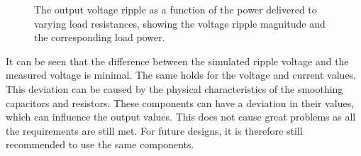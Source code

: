 \begin{figure}[H]
\begin{minipage}{0.48\textwidth}
        \label{tab:CharacteristicsSim}
    \end{minipage}\hfill
    \begin{minipage}{0.48\textwidth}
        \centering
        \captionsetup{justification=raggedright, labelfont=bf}
        \caption{The output voltage ripple as a function of the power delivered to varying load resistances, showing the voltage ripple magnitude and the corresponding load power.}
        \label{fig:OutputVoltageRipplePower}
    \end{minipage}
\end{figure}

It can be seen that the difference between the simulated ripple voltage and the measured voltage is minimal. The same holds for the voltage and current values. This deviation can be caused by the physical characteristics of the smoothing capacitors and resistors. These components can have a deviation in their values, which can influence the output values. This does not cause great problems as all the requirements are still met. For future designs, it is therefore still recommended to use the same components.

